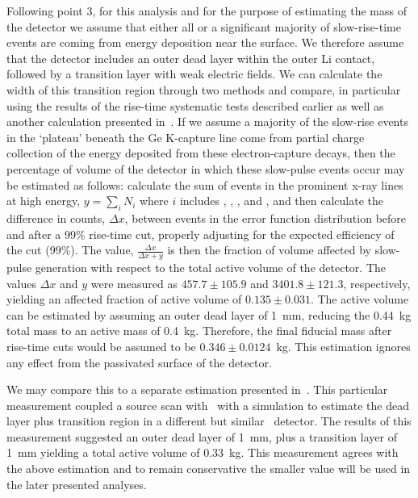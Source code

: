 	Following point 3, for this analysis and for the purpose of estimating the mass of the detector we assume that either all or a significant majority of slow-rise-time events are coming from energy deposition near the surface.  We therefore assume that the detector includes an outer dead layer within the outer Li contact, followed by a transition layer with weak electric fields.  We can calculate the width of this transition region through two methods and compare, in particular using the results of the rise-time systematic tests described earlier as well as another calculation presented in~\cite{Aalseth:2010aa}.  If we assume a majority of the slow-rise events in the `plateau' beneath the Ge K-capture line come from partial charge collection of the energy deposited from these electron-capture decays, then the percentage of volume of the detector in which these slow-pulse events occur may be estimated as follows:  calculate the sum of events in the prominent x-ray lines at high energy, $ y = \sum_{i} N_{i}$ where $i$ includes \gersixeight, \galsixeight, \znsixfive, and \asseventhree, and then calculate the difference in counts, $\Delta x$, between events in the error function distribution before and after a 99\% rise-time cut, properly adjusting for the expected efficiency of the cut (99\%).  The value, $\frac{\Delta x}{\Delta x + y}$ is then the fraction of volume affected by slow-pulse generation with respect to the total active volume of the detector.  The values $\Delta x$ and $y$ were measured as $457.7\pm105.9$ and $3401.8\pm121.3$, respectively, yielding an affected fraction of active volume of $0.135\pm0.031$.  The active volume can be estimated by assuming an outer dead layer of 1~mm, reducing the 0.44~kg total mass to an active mass of 0.4~kg.  Therefore, the final fiducial mass after rise-time cuts would be assumed to be $0.346\pm0.0124$~kg.  This estimation ignores any effect from the passivated surface of the detector.

	We may compare this to a separate estimation presented in~\cite{Aalseth:2010aa}.  This particular measurement coupled a source scan with \amtwofourone~with a simulation to estimate the dead layer plus transition region in a different but similar \ppc~detector.  The results of this measurement suggested an outer dead layer of 1~mm, plus a transition layer of 1~mm yielding a total active volume of 0.33~kg.  This measurement agrees with the above estimation and to remain conservative the smaller value will be used in the later presented analyses.
	
